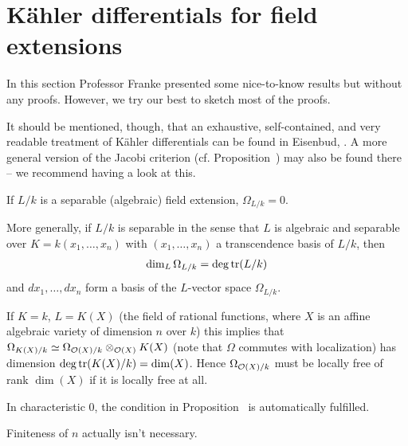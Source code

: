 \documentclass[a4paper,parskip=half,numbers=enddot, DIV=12]{scrreprt}
\begin{document}
\section{Kähler differentials for field extensions}
In this section Professor Franke presented some nice-to-know results but without any proofs. However, we try our best to sketch most of the proofs. 

It should be mentioned, though, that an exhaustive, self-contained, and very readable treatment of Kähler differentials can be found in Eisenbud, \cite[Chapter~16]{eisenbudCommAlg}. A more general version of the Jacobi criterion (cf. Proposition~) may also be found there -- we recommend having a look at this.

\begin{prop}
	\begin{alphanumerate}
		\item {}If $L/k$ is a separable (algebraic) field extension, $\Omega_{L/k} = 0$.
		\item More generally, if $L/k$ is separable in the sense that $L$ is algebraic and separable over $K=k(x_1,\ldots,x_n)$ with $(x_1,\ldots,x_n)$ a transcendence basis of $L/k$, then
		\begin{align*}
			\dim_L\Omega_{L/k}=\deg\operatorname{tr}(L/k)
		\end{align*}
		and $dx_1,\ldots,dx_n$ form a basis of the $L$-vector space $\Omega_{L/k}$.
	\end{alphanumerate}
\end{prop}
\begin{rem*}
	\begin{alphanumerate}
		\item If $K = k$, $L = K(X)$ (the field of rational functions, where $X$ is an affine algebraic variety of dimension $n$ over $k$) this implies that $\Omega_{K(X)/k} \simeq \Omega_{\mathcal{O}(X)/k} \otimes_{\mathcal{O}(X)} K(X) $ (note that $\Omega$ commutes with localization) has dimension $\deg\operatorname{tr}(K(X)/k) = \dim (X)$. Hence $\Omega_{\mathcal{O}(X)/k}$ must be locally free of rank $\dim(X)$ if it is locally free at all.
		\item In characteristic 0, the condition in Proposition~ is automatically fulfilled.
		\item Finiteness of $n$ actually isn't necessary.
	\end{alphanumerate}    
\end{rem*}
\end{document}
